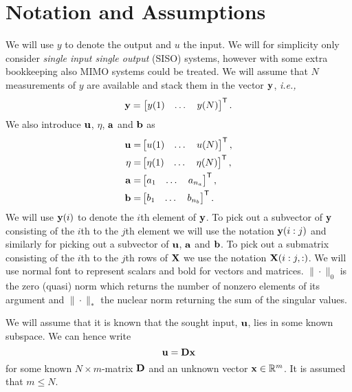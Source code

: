 \documentclass{ifacconf}
\newcommand{\T}{\mathsf{T}}
\renewcommand{\b}{{ b}}
\newcommand{\xx}{{\bf x}}
\newcommand{\DD}{{\bf D}}
\newcommand{\bb}{{\bf b}}
\renewcommand{\aa}{{\bf a}}
\newcommand{\uu}{{\bf  u}}
\newcommand{\X}{{\bf X}}
\newcommand{\0}{{\bf 0}}
\newcommand{\yy}{{\bf y}}
\newcommand{\y}{{ y}}
\renewcommand{\a}{a}
\newcommand{\ie}{\textit{i.e.,~}}
\renewcommand{\Re}{{\mathbb{R}}}
\begin{document}
\section{Notation and Assumptions}

We will use $y$ to denote the output and $u$ the input. We will for
simplicity only consider \textit{single input single output} (SISO)
systems, however with some extra bookkeeping also MIMO systems could
be treated. We will assume
that $N$ measurements of $y$ are available and stack them in the vector
$\yy$, \ie \begin{align} \yy=\begin{bmatrix} \y(1) &\dots &
   \y(N)  \end{bmatrix}^\T.\end{align}  We also introduce $\uu$, $\eta$, $\aa$
and $\bb$
 as
\begin{align} \uu=&\begin{bmatrix} u(1) &\dots &
    u(N)  \end{bmatrix}^\T,\\
 {\eta}=&\begin{bmatrix} \eta(1) &\dots &
   \eta(N) \end{bmatrix}^\T,\\ 
\aa=&\begin{bmatrix} \a_1 &\dots &
    \a_{n_a}  \end{bmatrix}^\T,\\
\bb=&\begin{bmatrix} \b_1 &\dots &
    \b_{n_b}  \end{bmatrix}^\T.\end{align} We will use $\yy(i)$ to
denote the $i$th element of $\yy$. To pick out a subvector of $\yy$
consisting of the $i$th to the $j$th element we will use the notation
$\yy(i:j)$ and similarly for picking out a subvector of $\uu$, $\aa$
and $\bb$. To pick out a submatrix consisting of the $i$th to the
$j$th rows of $\X$ we use the notation $\X(i:j,:)$.
We will use normal font to represent scalars and bold for vectors and
matrices. 
$\|\cdot \|_0$ is the zero (quasi) norm which returns the
number of nonzero elements of its argument and $\|\cdot\|_*$ the
nuclear norm returning the sum of the singular values.




We will assume that it is known that the sought input, $\uu$, lies in
some known subspace. We can hence write 
\begin{equation}\label{eq:assum}
\uu=\DD\xx
\end{equation}
for some known $N\times m$-matrix $\DD$ and an unknown vector $\xx \in
\Re^m$. It is assumed that $m\leq N$.
\end{document}
